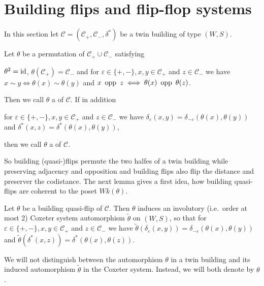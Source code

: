 \section{Building flips and flip-flop systems}
In this section let $\mathcal C = (\mathcal C_+, \mathcal C_-, \delta^*)$ be a twin building of type $(W,S)$.

\begin{defi}
	Let $\theta$ be a permutation of $\mathcal C_+ \cup \mathcal C_-$ satisfying
	\begin{axioms}
		 $\theta^2 = \operatorname{id}$,
		 $\theta(\mathcal C_+) = \mathcal C_-$ and
		 for $\varepsilon \in \{+,-\}, x,y \in \mathcal C_+$ and $z \in \mathcal C_-$ we have $x \sim y \iff \theta(x) \sim \theta(y)$ and $x \opp z \iff \theta(x) \opp \theta(z)$.
	\end{axioms}
	Then we call $\theta$ a  of $\mathcal{C}$. If in addition
	\begin{axioms}
		 for $\varepsilon \in \{+,-\}, x,y \in \mathcal C_+$ and $z \in \mathcal C_-$ we have $\delta_\varepsilon(x,y) = \delta_{-\varepsilon}(\theta(x),\theta(y))$ and $\delta^*(x,z) = \delta^*(\theta(x),\theta(y))$, 
	\end{axioms}
	then we call $\theta$ a  of $\mathcal C$.
\end{defi}

So building (quasi-)flips permute the two halfes of a twin building while preserving adjacency and opposition and building flips also flip the distance and preserver the codistance. The next lemma gives a first idea, how building quasi-flips are coherent to the poset $Wk(\theta)$.

\begin{lemm}
	Let $\theta$ be a building quasi-flip of $\mathcal C$. Then $\theta$ induces an involutory (i.e.\ order at most 2) Coxeter system automorphism $\tilde \theta$ on $(W,S)$, so that for $\varepsilon \in \{+,-\}, x,y \in \mathcal C_+$ and $z \in \mathcal C_-$ we have $\tilde \theta(\delta_\varepsilon(x,y)) = \delta_{-\varepsilon}(\theta(x), \theta(y))$ and $\tilde \theta(\delta^*(x,z)) = \delta^*(\theta(x), \theta(z))$.
\end{lemm}

\begin{rema}
	We will not distinguish between the automorphism $\theta$ in a twin building and its induced automorphism $\tilde \theta$ in the Coxeter system. Instead, we will both denote by $\theta$.
\end{rema}

